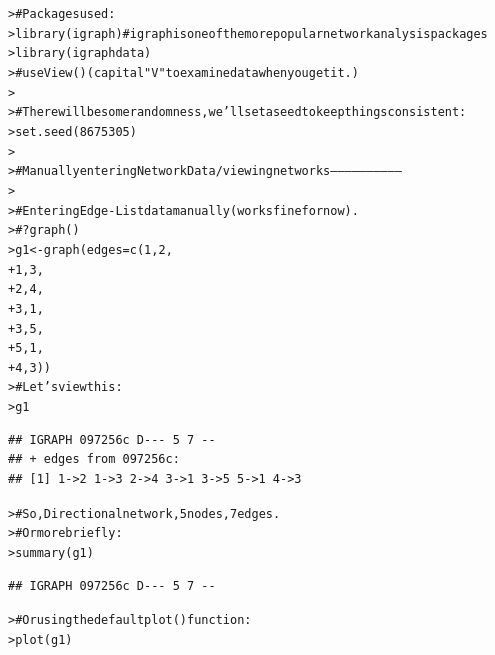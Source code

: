 \documentclass[12pt]{article}\usepackage[]{graphicx}\usepackage[]{color}
\makeatletter
\newcommand{\hlnum}[1]{\textcolor[rgb]{0.82,0.78,0.62}{#1}}%
\newcommand{\hlcom}[1]{\textcolor[rgb]{0.404,0.408,0.42}{#1}}%
\newcommand{\hlstd}[1]{\textcolor[rgb]{0.882,0.878,0.898}{#1}}%
\newcommand{\hlkwb}[1]{\textcolor[rgb]{0.902,0.675,0.196}{#1}}%
\newcommand{\hlkwc}[1]{\textcolor[rgb]{0.812,0.522,0.388}{#1}}%
\newcommand{\hlkwd}[1]{\textcolor[rgb]{0.733,0.388,0.812}{#1}}%
\newenvironment{kframe}{%
 \def\at@end@of@kframe{}%
 \ifinner\ifhmode%
  \def\at@end@of@kframe{\end{minipage}}%
  \begin{minipage}{\columnwidth}%
 \fi\fi%
 \def\FrameCommand##1{\hskip\@totalleftmargin \hskip-\fboxsep
 \colorbox{shadecolor}{##1}\hskip-\fboxsep
     \hskip-\linewidth \hskip-\@totalleftmargin \hskip\columnwidth}%
 \MakeFramed {\advance\hsize-\width
   \@totalleftmargin\z@ \linewidth\hsize
   \@setminipage}}%
 {\par\unskip\endMakeFramed%
 \at@end@of@kframe}
\newenvironment{knitrout}{}{} %
\makeatother
\begin{document}
\begin{flushleft}
\begin{center}
\begin{knitrout}
\color{fgcolor}\begin{kframe}
\begin{alltt}
\hlstd{> }\hlcom{# Packages used:}
\hlstd{> }\hlkwd{library}\hlstd{(igraph)} \hlcom{# igraph is one of the more popular network analysis packages}
\hlstd{> }\hlkwd{library}\hlstd{(igraphdata)}
\hlstd{> }\hlcom{# use  View() (capital "V" to examine data when you get it.)}
\hlstd{> }
\hlstd{> }\hlcom{# There will be some randomness, we'll set a seed to keep things consistent:}
\hlstd{> }\hlkwd{set.seed}\hlstd{(}\hlnum{8675305}\hlstd{)}
\hlstd{> }
\hlstd{> }\hlcom{# Manually entering Network Data/ viewing networks -----------------------------}
\hlstd{> }
\hlstd{> }\hlcom{# Entering Edge-List data manually (works fine for now).}
\hlstd{> }\hlcom{# ?graph()}
\hlstd{> }\hlstd{g1} \hlkwb{<-} \hlkwd{graph}\hlstd{(}\hlkwc{edges}\hlstd{=}\hlkwd{c}\hlstd{(}\hlnum{1}\hlstd{,}\hlnum{2}\hlstd{,}
\hlstd{+ }                    \hlnum{1}\hlstd{,}\hlnum{3}\hlstd{,}
\hlstd{+ }                    \hlnum{2}\hlstd{,}\hlnum{4}\hlstd{,}
\hlstd{+ }                    \hlnum{3}\hlstd{,}\hlnum{1}\hlstd{,}
\hlstd{+ }                    \hlnum{3}\hlstd{,}\hlnum{5}\hlstd{,}
\hlstd{+ }                    \hlnum{5}\hlstd{,}\hlnum{1}\hlstd{,}
\hlstd{+ }                    \hlnum{4}\hlstd{,}\hlnum{3}\hlstd{))}
\hlstd{> }\hlcom{# Let's view this:}
\hlstd{> }\hlstd{g1}
\end{alltt}
\begin{verbatim}
## IGRAPH 097256c D--- 5 7 -- 
## + edges from 097256c:
## [1] 1->2 1->3 2->4 3->1 3->5 5->1 4->3
\end{verbatim}
\begin{alltt}
\hlstd{> }\hlcom{# So, Directional network, 5 nodes, 7 edges.}
\hlstd{> }\hlcom{# Or more briefly:}
\hlstd{> }\hlkwd{summary}\hlstd{(g1)}
\end{alltt}
\begin{verbatim}
## IGRAPH 097256c D--- 5 7 --
\end{verbatim}
\begin{alltt}
\hlstd{> }\hlcom{# Or using the default plot() function:}
\hlstd{> }\hlkwd{plot}\hlstd{(g1)}
\end{alltt}
\end{kframe}

\end{knitrout}
\end{center}
\end{flushleft}
\end{document}
